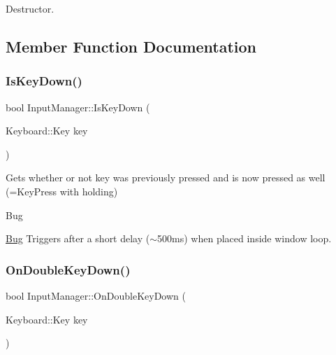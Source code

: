Destructor. 



\subsection{Member Function Documentation}
\mbox{\label{class_input_manager_acf3316661127cbdda5f0bd09cdc46a43}} 
\subsubsection{\texorpdfstring{Is\+Key\+Down()}{IsKeyDown()}}
{\footnotesize\ttfamily bool Input\+Manager\+::\+Is\+Key\+Down (\begin{DoxyParamCaption}\item[{Keyboard\+::\+Key}]{key }\end{DoxyParamCaption})}



Gets whether or not key was previously pressed and is now pressed as well (=Key\+Press with holding) 

\begin{DoxyRefDesc}{Bug}
\item[\mbox{\hyperlink{bug__bug000001}{Bug}}]Triggers after a short delay ($\sim$500ms) when placed inside window loop. ~\newline
 \end{DoxyRefDesc}
\mbox{\label{class_input_manager_a1e80afe2aecb16c9a9b45a111b7f83a5}} 
\subsubsection{\texorpdfstring{On\+Double\+Key\+Down()}{OnDoubleKeyDown()}}
{\footnotesize\ttfamily bool Input\+Manager\+::\+On\+Double\+Key\+Down (\begin{DoxyParamCaption}\item[{Keyboard\+::\+Key}]{key }\end{DoxyParamCaption})}

\mbox{\label{class_input_manager_a426512406d24de8dd5f0fb2241f6ea3c}} 
